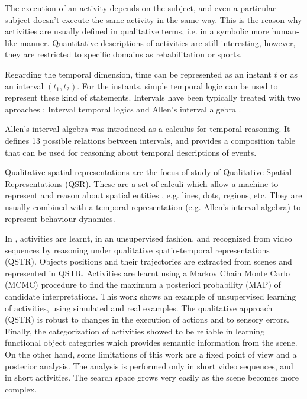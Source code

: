 The execution of an activity depends on the subject, and even a particular subject doesn't execute the same activity in the same way.
This is the reason why activities are usually defined in qualitative terms, i.e. in a symbolic more human-like manner.
Quantitative descriptions of activities are still interesting, however, they are restricted to specific domains as rehabilitation or sports.

Regarding the temporal dimension, time can be represented as an instant $t$ or as an interval $(t_1,t_2)$. 
For the instants, simple temporal logic can be used to represent these kind of statements. 
Intervals have been typically treated with two aproaches \citep{Fisher2008_TempRepReas}: Interval temporal logics \citep{Moszkowski1983_RDC} and Allen's interval algebra \citep{Allen83_MaintainingKnowledgeTemporal}.


Allen's interval algebra was introduced as a calculus for temporal reasoning.
It defines 13 possible relations between intervals, and provides a composition table that can be used for reasoning about temporal descriptions of events.

Qualitative spatial representations are the focus of study of Qualitative Spatial Representations (QSR).
These are a set of calculi which allow a machine to represent and reason about spatial entities \citep{Cohn2008_QSRR}, e.g. lines, dots, regions, etc.
They are usually combined with a temporal representation (e.g. Allen's interval algebra) to represent behaviour dynamics.

In \citep{Sridhar10_PhD_UnsupervisedLearningEvent}, activities are learnt, in an unsupervised fashion, and recognized from video sequences by reasoning under qualitative spatio-temporal representations (QSTR). 
Objects positions and their trajectories are extracted from scenes and represented in QSTR.
Activities are learnt using a Markov Chain Monte Carlo (MCMC) procedure to find the maximum a posteriori probability (MAP) of candidate interpretations.
This work shows an example of unsupervised learning of activities, using simulated and real examples.
The qualitative approach (QSTR) is robust to changes in the execution of actions and to sensory errors.
Finally, the categorization of activities showed to be reliable in learning functional object categories which provides semantic information from the scene.
On the other hand, some limitations of this work are a fixed point of view and a posterior analysis.
The analysis is performed only in short video sequences, and in short activities.
The search space grows very easily as the scene becomes more complex.

